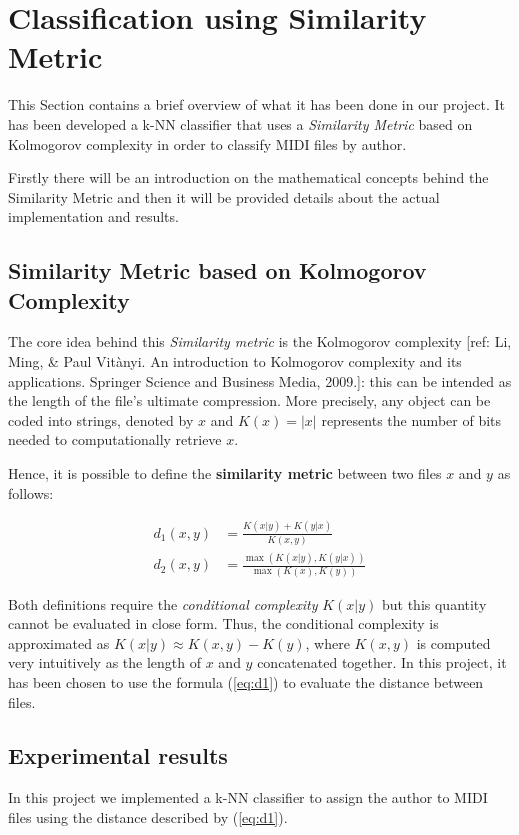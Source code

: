 \documentclass[a4paper]{article}
\begin{document}
	
	\section{Classification using Similarity Metric}
	\lettrine[nindent=0em,lines=2]{T}{}his Section contains a brief overview of what it has been done in our project. It has been developed a k-NN classifier that uses a  \textit{Similarity Metric} based on Kolmogorov complexity in order to classify MIDI files by author. 
	
	Firstly there will be an introduction on the mathematical concepts behind the Similarity Metric and then it will be provided details about the actual implementation and results.
	
	\subsection{Similarity Metric based on Kolmogorov Complexity}
	The core idea behind this \textit{Similarity metric} is the Kolmogorov complexity [ref: Li, Ming, \& Paul Vit\`{a}nyi. An introduction to Kolmogorov complexity and its applications. Springer Science and Business Media, 2009.]: this can be intended as the length of the file's ultimate compression. More precisely, any object can be coded into strings, denoted by $x$ and $K(x) = |x|$ represents the number of bits needed to computationally retrieve $x$.
	
	Hence, it is possible to define the \textbf{similarity metric} between two files $x$ and $y$ as follows:
	
	\begin{align}
		\label{eq:d1}
		d_1(x,y) &= \frac{K(x|y) + K(y|x)}{K(x,y)} \\
		\label{eq:d2}
		d_2(x,y) &= \frac{\max{\left(K(x|y),K(y|x)\right)}}{\max{\left(K(x),K(y)\right)}}
	\end{align}
	
	Both definitions require the \textit{conditional complexity} $K(x|y)$ but this quantity cannot be evaluated in close form. Thus, the conditional complexity is approximated as $K(x|y) \approx K(x,y) - K(y)$, where $K(x,y)$ is computed very intuitively as the length of $x$ and $y$ concatenated together. In this project, it has been chosen to use the formula (\ref{eq:d1}) to evaluate the distance between files.
	
	\subsection{Experimental results}
	In this project we implemented a k-NN classifier to assign the author to MIDI files using the distance described by (\ref{eq:d1}). 
	
\end{document}
